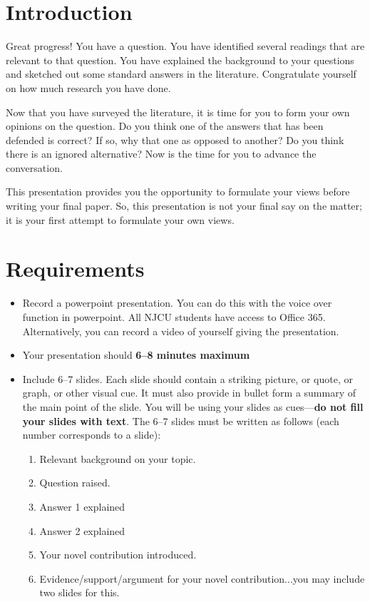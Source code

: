\documentclass[oneside]{article}
\begin{document}
\section*{Introduction}\label{introduction}

Great progress! You have a question. You have identified several
readings that are relevant to that question. You have explained the
background to your questions and sketched out some standard answers in
the literature. Congratulate yourself on how much research you have
done.

Now that you have surveyed the literature, it is time for you to form
your own opinions on the question. Do you think one of the answers that
has been defended is correct? If so, why that one as opposed to another?
Do you think there is an ignored alternative? Now is the time for you to
advance the conversation.

This presentation provides you the opportunity to formulate your views
before writing your final paper. So, this presentation is not your final say on the matter; it is your first attempt to formulate your own views. 

\section*{Requirements}\label{requirements}

\begin{itemize}
\item Record a powerpoint presentation. You can do this with the voice over function in powerpoint. All NJCU students have access to Office 365. Alternatively, you can record a video of yourself giving the presentation. 
\item Your presentation should \textbf{6--8 minutes maximum}
\item Include 6--7 slides. Each slide should contain a striking picture, or quote,
or graph, or other visual cue. It must also provide in bullet form a
summary of the main point of the slide. You will be using your slides as
cues---\textbf{do not fill your slides with text}. The 6--7 slides must be
written as follows (each number corresponds to a slide):

\begin{enumerate}
\item
  Relevant background on your topic.
\item
  Question raised.
\item
  Answer 1 explained
\item
  Answer 2 explained
\item
  Your novel contribution introduced.
\item
  Evidence/support/argument for your novel contribution...you may include two slides for this.

\end{enumerate}
\end{itemize}
\end{document}
